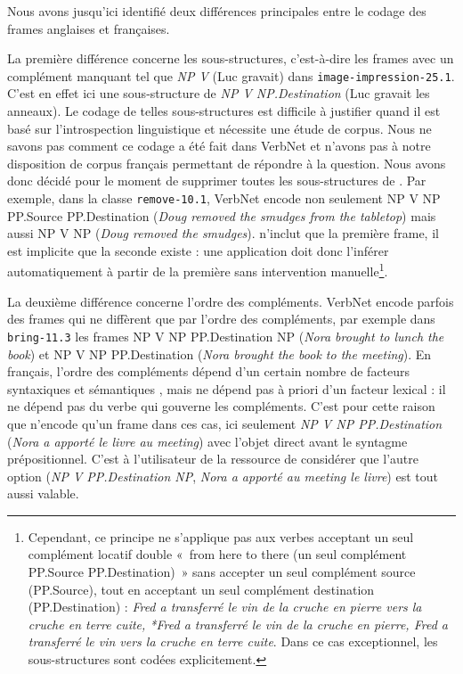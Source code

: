 Nous avons jusqu'ici identifié deux différences principales entre le codage des
frames anglaises et françaises.

La première différence concerne les sous-structures, c'est-à-dire les frames
avec un complément manquant tel que \textit{NP V} (Luc gravait) dans
{\color{blue}\texttt{image-impression-25.1}}. C'est en effet ici une
sous-structure de \textit{NP V NP.Destination} (Luc gravait les anneaux). Le
codage de telles sous-structures est difficile à justifier quand il est basé
sur l'introspection linguistique et nécessite une étude de corpus. Nous ne
savons pas comment ce codage a été fait dans VerbNet et n'avons pas à notre
disposition de corpus français permettant de répondre à la question. Nous avons
donc décidé pour le moment de supprimer toutes les sous-structures de
\verbenet{}. Par exemple, dans la classe {\color{blue}\texttt{remove-10.1}},
VerbNet encode non seulement NP V NP PP.Source PP.Destination (\textit{Doug
removed the smudges from the tabletop}) mais aussi NP V NP (\textit{Doug removed
the smudges}). \verbenet{} n'inclut que la première frame, il est implicite que
la seconde existe : une application doit donc l'inférer automatiquement à
partir de la première sans intervention manuelle\footnote{Cependant, ce
    principe ne s'applique pas aux verbes acceptant un seul complément locatif
    double «~from here to there (un seul complément PP.Source PP.Destination)~»
    sans accepter un seul complément source (PP.Source), tout en acceptant un
    seul complément destination (PP.Destination) : \textit{Fred a transferré le
        vin de la cruche en pierre vers la cruche en terre cuite, *Fred a
        transferré le vin de la cruche en pierre, Fred a transferré le vin vers
        la cruche en terre cuite}. Dans ce cas exceptionnel, les
    sous-structures sont codées explicitement.}.

La deuxième différence concerne l'ordre des compléments. VerbNet encode parfois
des frames qui ne diffèrent que par l'ordre des compléments, par exemple dans
{\color{blue}\texttt{bring-11.3}} les frames NP V NP PP.Destination NP
(\textit{Nora brought to lunch the book}) et NP V NP PP.Destination (\textit{Nora
brought the book to the meeting}). En français, l'ordre des compléments dépend
d'un certain nombre de facteurs syntaxiques et sémantiques
\citep{thuilier2012contraintes}, mais ne dépend pas à priori d'un facteur
lexical : il ne dépend pas du verbe qui gouverne les compléments. C'est pour
cette raison que \verbenet{} n'encode qu'un frame dans ces cas, ici seulement
\textit{NP V NP PP.Destination} (\textit{Nora a apporté le livre au meeting}) avec
l'objet direct avant le syntagme prépositionnel. C'est à l'utilisateur de la
ressource de considérer que l'autre option (\textit{NP V PP.Destination NP},
\textit{Nora a apporté au meeting le livre}) est tout aussi valable.

